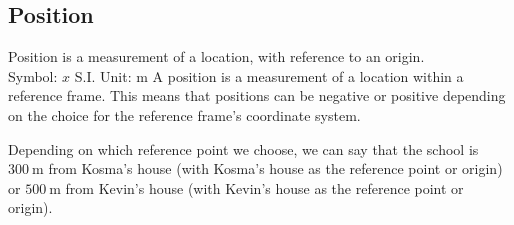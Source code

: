             \subsection*{Position}
            \nopagebreak
{} {Position is a measurement of a location, with reference to an origin.\\
Symbol: $x$\hspace{2cm} S.I. Unit: m} 
        \label{m38787*id62737}A position is a measurement of a location within a reference frame. This means that positions can be negative or positive depending on the choice for the reference frame's coordinate system. 

Depending on which reference point we choose, we can say that the school is $300~\text{m}$ from Kosma's house (with Kosma's house as the reference point or origin) or  $500~\text{m}$ from Kevin's house (with Kevin's house as the reference point or origin).\par 

